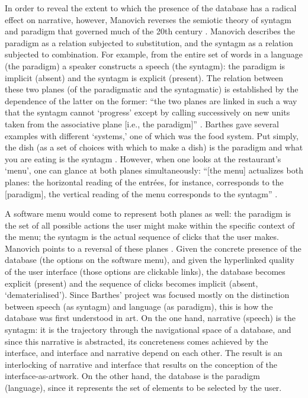 
In order to reveal the extent to which the presence of the database has a radical effect on narrative, however, Manovich reverses the semiotic theory of syntagm and paradigm that governed much of the 20th century \parencite[231]{Man01:The}. Manovich describes the paradigm as a relation subjected to substitution, and the syntagm as a relation subjected to combination. For example, from the entire set of words in a language (the paradigm) a speaker constructs a speech (the syntagm): the paradigm is implicit (absent) and the syntagm is explicit (present). The relation between these two planes (of the paradigmatic and the syntagmatic) is established by the dependence of the latter on the former: ``the two planes are linked in such a way that the syntagm cannot `progress' except by calling successively on new units taken from the associative plane [i.e., the paradigm]'' \parencite[59]{Bar68:Ele}. Barthes gave several examples with different `systems,' one of which was the food system. Put simply, the dish (as a set of choices with which to make a dish) is the paradigm and what you are eating is the syntagm \parencite[63]{Bar68:Ele}. However, when one looks at the restaurant's `menu', one can glance at both planes simultaneously: ``[the menu] actualizes both planes: the horizontal reading of the entrées, for instance, corresponds to the [paradigm], the vertical reading of the menu corresponds to the syntagm'' \parencite[63]{Bar68:Ele}. 

A software menu would come to represent both planes as well: the paradigm is the set of all possible actions the user might make within the specific context of the menu; the syntagm is the actual sequence of clicks that the user makes. Manovich points to a reversal of these planes . Given the concrete presence of the database (the options on the software menu), and given the hyperlinked quality of the user interface (those options are clickable links), the database becomes explicit (present) and the sequence of clicks becomes implicit (absent, `dematerialised'). Since Barthes' project was focused mostly on the distinction between speech (as syntagm) and language (as paradigm), this is how the database was first understood in art. On the one hand, narrative (speech) is the syntagm: it is the trajectory through the navigational space of a database, and since this narrative is abstracted, its concreteness comes achieved by the interface, and interface and narrative depend on each other. The result is an interlocking of narrative and interface that results on the conception of the interface-as-artwork. On the other hand, the database is the paradigm (language), since it represents the set of elements to be selected by the user.

